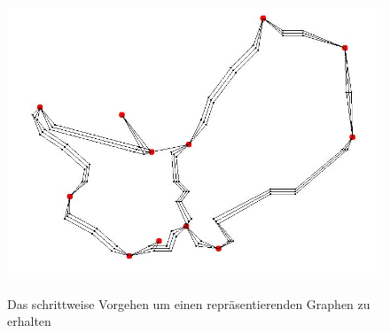 \begin{figure}[t]
	{\includegraphics[scale=0.4]{bilder/ausschnittfertigergraph}\label{fig_ausschnittfertigergraph}
	}
	\\
	\caption[Das schrittweise Vorgehen um einen repräsentierenden Graphen zu erhalten]{Das schrittweise Vorgehen um einen repräsentierenden Graphen zu erhalten}
	\label{fig_testbild2}
\end{figure}